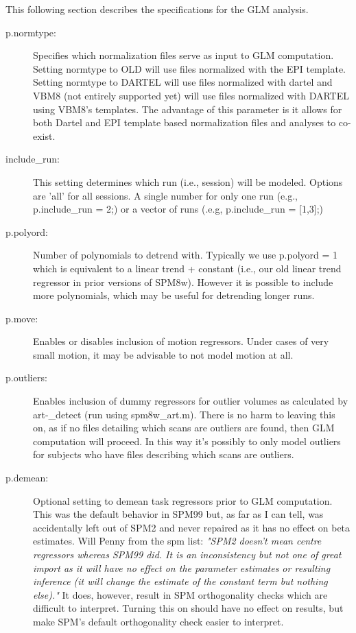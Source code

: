 \documentclass[12pt]{article}
\begin{document}

This following section describes the specifications for the GLM analysis.

\begin{description}
\item[p.normtype:] Specifies which normalization files serve as input to GLM computation. Setting normtype to OLD will use files normalized with the EPI template. Setting normtype to DARTEL will use files normalized with dartel and VBM8 (not entirely supported yet) will use files normalized with DARTEL using VBM8's templates. The advantage of this parameter is it allows for both Dartel and EPI template based normalization files and analyses to co-exist.
\item[include\_run:] This setting determines which run (i.e., session) will be modeled. Options are 'all' for all sessions. A single number for only one run (e.g., p.include\_run = 2;) or a vector of runs (.e.g, p.include\_run = [1,3];)
\item[p.polyord:] Number of polynomials to detrend with. Typically we use p.polyord = 1 which is equivalent to a linear trend + constant (i.e., our old linear trend regressor in prior versions of SPM8w). However it is possible to include more polynomials, which may be useful for detrending longer runs.
\item[p.move:] Enables or disables inclusion of motion regressors. Under cases of very small motion, it may be advisable to not model motion at all.
\item[p.outliers:] Enables inclusion of dummy regressors for outlier volumes as calculated by art-\_detect (run using spm8w\_art.m). There is no harm to leaving this on, as if no files detailing which scans are outliers are found, then GLM computation will proceed. In this way it's possibly to only model outliers for subjects who have files describing which scans are outliers.
\item[p.demean:] Optional setting to demean task regressors prior to GLM computation. This was the default behavior in SPM99 but, as far as I can tell, was accidentally left out of SPM2 and never repaired as it has no effect on beta estimates. Will Penny from the spm list: \textit{"SPM2 doesn’t mean centre regressors whereas SPM99 did. It is an inconsistency but not one of great import as it will have no effect on the parameter estimates or resulting inference (it will change the estimate of the constant term but nothing else)."} It does, however, result in SPM orthogonality checks which are difficult to interpret. Turning this on should have no effect on results, but make SPM's default orthogonality check easier to interpret.

\end{description}
\end{document}
